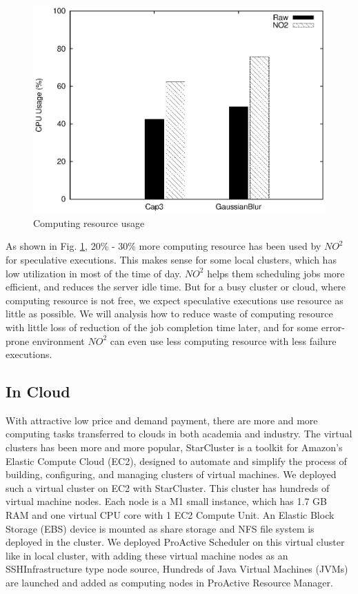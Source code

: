 \begin{figure}
\centering
\includegraphics[width=0.9\columnwidth]{figures/resource_usage.eps}
\caption{Computing resource usage}
\label{figure:resourceusage}
\end{figure}

As shown in Fig. \ref{figure:resourceusage}, 20\% - 30\% more computing resource has been used by $NO^2$ for speculative executions. This makes sense for some local clusters, which has low utilization in most of the time of day. $NO^2$ helps them scheduling jobs more efficient, and reduces the server idle time. But for a busy cluster or cloud, where computing resource is not free, we expect speculative executions use resource as little as possible. We will analysis how to reduce waste of computing resource with little loss of reduction of the job completion time later, and for some error-prone environment $NO^2$ can even use less computing resource with less failure executions.

\subsection{In Cloud}

With attractive low price and demand payment, there are more and more computing tasks transferred to clouds in both academia and industry. The virtual clusters has been more and more popular, StarCluster \cite{starcluster} is a toolkit for Amazon’s Elastic Compute Cloud (EC2), designed to automate and simplify the process of building, configuring, and managing clusters of virtual machines. We deployed such a virtual cluster on EC2 with StarCluster. This cluster has hundreds of virtual machine nodes. Each node is a M1 small instance, which has 1.7 GB RAM and one virtual CPU core with 1 EC2 Compute Unit. An Elastic Block Storage (EBS) device is mounted as share storage and NFS file system is deployed in the cluster. We deployed ProActive Scheduler on this virtual cluster like in local cluster, with adding these virtual machine nodes as an SSHInfrastructure type node source, Hundreds of Java Virtual Machines (JVMs) are launched and added as computing nodes in ProActive Resource Manager.

